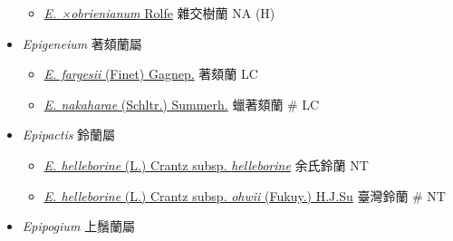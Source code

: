 \begin{itemize}
  \begin{itemize}
        \item[] \href{http://www.theplantlist.org/tpl1.1/search?q=Epidendrum+×obrienianum}{\textit{E. ×obrienianum} Rolfe}   雜交樹蘭   NA (H)
  \end{itemize}
 \item[] \textit{Epigeneium} 著頦蘭屬
                                
  \begin{itemize}
        \item[] \href{http://www.theplantlist.org/tpl1.1/search?q=Epigeneium+fargesii}{\textit{E. fargesii} (Finet) Gagnep.}   著頦蘭   LC
        \item[] \href{http://www.theplantlist.org/tpl1.1/search?q=Epigeneium+nakaharae}{\textit{E. nakaharae} (Schltr.) Summerh.}   蠟著頦蘭  \# LC
  \end{itemize}
 \item[] \textit{Epipactis} 鈴蘭屬
                                
  \begin{itemize}
        \item[] \href{http://www.theplantlist.org/tpl1.1/search?q=Epipactis+helleborine+subsp.+helleborine}{\textit{E. helleborine} (L.) Crantz subsp. \textit{helleborine}}   余氏鈴蘭   NT
        \item[] \href{http://www.theplantlist.org/tpl1.1/search?q=Epipactis+helleborine+subsp.+ohwii}{\textit{E. helleborine} (L.) Crantz subsp. \textit{ohwii} (Fukuy.) H.J.Su}   臺灣鈴蘭  \# NT
  \end{itemize}
 \item[] \textit{Epipogium} 上鬚蘭屬
                                

\end{itemize}
